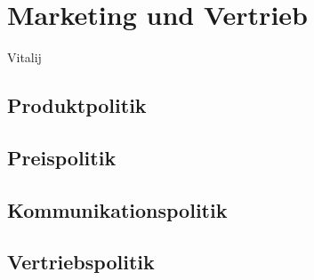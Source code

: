 
\section{Marketing und Vertrieb}
Vitalij
\subsection{Produktpolitik}
\subsection{Preispolitik}
\subsection{Kommunikationspolitik}
\subsection{Vertriebspolitik}
